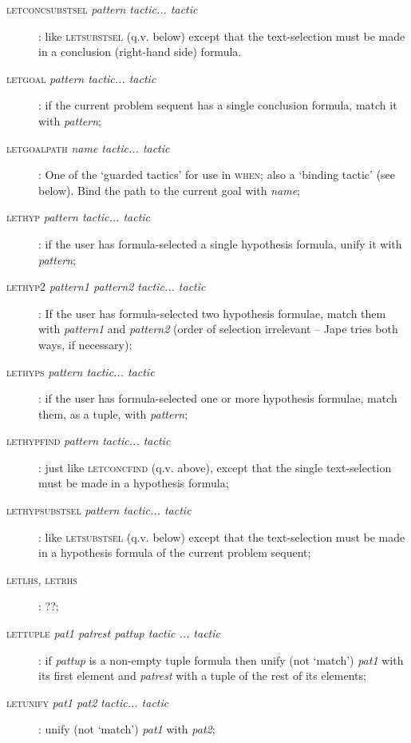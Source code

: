 \begin{description}
\begin{description}
\item [\textsc{letconcsubstsel} \textit{pattern tactic... tactic}]: like \textsc{letsubstsel} (q.v. below) except that the text-selection must be made in a conclusion (right-hand side) formula.

\item [\textsc{letgoal} \textit{pattern tactic... tactic}]: if the current problem sequent has a single conclusion formula, match it with \textit{pattern}; 

\item [\textsc{letgoalpath}  \textit{name tactic... tactic}]: One of the `guarded tactics' for use in \textsc{when}; also a `binding tactic' (see below). Bind the path to the current goal with \textit{name}; 
\item [\textsc{lethyp} \textit{pattern tactic... tactic}]: if the user has formula-selected a single hypothesis formula, unify it with \textit{pattern}; 
\item [\textsc{lethyp2} \textit{pattern1 pattern2 tactic... tactic}]: If the user has formula-selected two hypothesis formulae, match them with \textit{pattern1} and \textit{pattern2} (order of selection irrelevant -- Jape tries both ways, if necessary); 
\item [\textsc{lethyps} \textit{pattern tactic... tactic}]: if the user has formula-selected one or more hypothesis formulae, match them, as a tuple, with \textit{pattern}; 


\item [\textsc{lethypfind} \textit{pattern tactic... tactic}]: just like \textsc{letconcfind} (q.v. above), except that the single text-selection must be made in a hypothesis formula;

\item [\textsc{lethypsubstsel} \textit{pattern tactic... tactic}]: like \textsc{letsubstsel} (q.v. below) except that the text-selection must be made in a hypothesis formula of the current problem sequent;

\item[\textsc{letlhs, letrhs}]: ??;

\item[\textsc{lettuple} \textit{pat1 patrest pattup tactic ... tactic}]: if \textit{pattup} is a non-empty tuple formula then unify (not `match') \textit{pat1} with its first element and \textit{patrest} with a tuple of the rest of its elements;

\item [\textsc{letunify} \textit{pat1 pat2} \textit{tactic... tactic}]: unify (not `match') \textit{pat1} with \textit{pat2};



\end{description}
\end{description}
